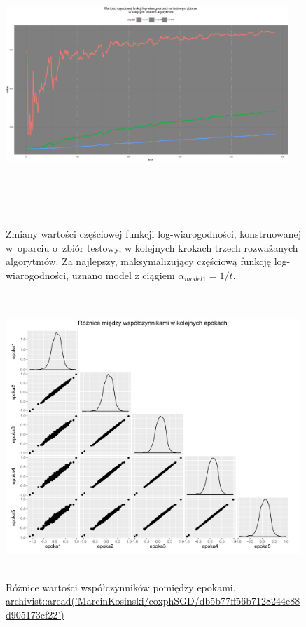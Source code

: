\begin{figure}[!ht]
\centering
\includegraphics[width=0.95\textwidth, height = 280pt]{Obrazki/analiza/wartosci_loglik_test_ver_minus.png}
\caption{\label{wykres5} Zmiany wartości częściowej funkcji log-wiarogodności, konstruowanej w~oparciu o~zbiór testowy, w kolejnych krokach trzech rozważanych algorytmów. Za najlepszy, maksymalizujący częściową funkcję log-wiarogodności, uznano model z ciągiem $\alpha_{model1} = 1/t$.}
\ \\
\includegraphics[width=0.99\textwidth, height = 280pt]{Obrazki/analiza/ggpairs_2.pdf}
\caption{\label{wykres6} Różnice wartości współczynników pomiędzy epokami. \\
\href{https://github.com/MarcinKosinski/coxphSGD/blob/master/gallery/db5b77ff56b7128244e88d905173cf22.rda?raw=true}{archivist::aread('MarcinKosinski/coxphSGD/db5b77ff56b7128244e88d905173cf22')}}
\end{figure}

